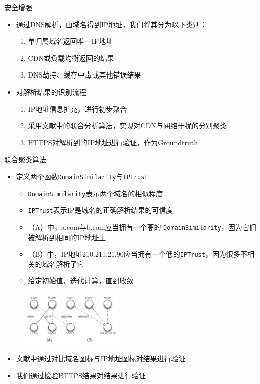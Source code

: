 \documentclass{beamer}
\begin{document}
\begin{frame}{安全增强}
  \begin{itemize}
    \item 通过DNS解析，由域名得到IP地址，我们将其分为以下类别：
  \begin{enumerate}
    \item 单归属域名返回唯一IP地址
    \item CDN或负载均衡返回的结果
    \item DNS劫持、缓存中毒或其他错误结果
  \end{enumerate}
  \item 对解析结果的识别流程
  \begin{enumerate}
    \item IP地址信息扩充，进行初步聚合
    \item 采用文献\cite{Scott2016}中的联合分析算法，实现对CDN与网络干扰的分别聚类
    \item HTTPS对解析到的IP地址进行验证，作为Groundtruth
  \end{enumerate}
  \end{itemize}
\end{frame}

\begin{frame}{联合聚类算法}
  \begin{itemize}
    \item 定义两个函数\texttt{DomainSimilarity}与\texttt{IPTrust}
    \begin{itemize}
      \item \texttt{DomainSimilarity}表示两个域名的相似程度
      \item \texttt{IPTrust}表示IP是域名的正确解析结果的可信度
      \item （A）中，a.com与b.com应当拥有一个高的 \texttt{DomainSimilarity}，因为它们被解析到相同的IP地址上
    \item （B）中，IP地址210.211.21.90应当拥有一个低的\texttt{IPTrust}，因为很多不相关的域名解析了它
    \item 给定初始值，迭代计算，直到收敛
    \end{itemize}
  \end{itemize}
  \begin{figure}[H] %
    \centering
    \includegraphics[width=5cm]{figures/ip_domains.png}
    \label{fig:ip_domains}
  \end{figure}
  \begin{itemize}
    \item 文献\cite{Scott2016}中通过对比域名图标与IP地址图标对结果进行验证
    \item 我们通过检验HTTPS结果对结果进行验证
  \end{itemize}
\end{frame}
\end{document}
